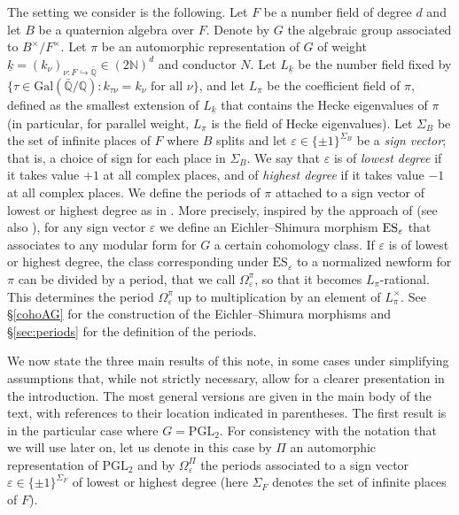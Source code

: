 \documentclass{amsart}
\theoremstyle{definition}
\theoremstyle{remark}
\numberwithin{equation}{section}
\newcommand{\Gal}{{\mathrm {Gal}}}
\newcommand{\PGL}{{\mathrm{PGL}}}
\newcommand{\Q}{{\mathbb Q}}
\newcommand{\N}{{\mathbb N}}
\begin{document}
The setting we consider is the following. Let $F$ be a number field of degree $d$ and let $B$ be a quaternion algebra over $F$. Denote by $G$ the algebraic group associated to $B^\times/F^\times$. Let $\pi$ be an automorphic representation of $G$ of weight $\underline{k}=(k_\nu)_{\nu:F\hookrightarrow \bar \Q}\in (2\N)^d$ and conductor $N$. Let $L_{\underline k}$ be the number field fixed by ${\{\tau\in\Gal(\bar \Q/\Q)\colon k_{\tau\nu}=k_\nu \text{ for all }\nu \}}$, and let $L_\pi$ be the coefficient field of $\pi$, defined as the smallest extension of $L_{\underline k}$ that contains the Hecke eigenvalues of $\pi$  (in particular, for parallel weight, $L_\pi$ is the field of Hecke eigenvalues). Let $\Sigma_B$ be the set of infinite places of $F$ where $B$ splits and let $\varepsilon  \in \{\pm 1\}^{\Sigma_B}$ be a \emph{sign vector}; that is, a choice of sign for each place in $\Sigma_B$.  We say that $\varepsilon$ is of \emph{lowest degree} if it takes value $+1$ at all complex places, and of \emph{highest degree} if it takes value $-1$ at all complex places.  We define the periods of $\pi$ attached to a sign vector of lowest or highest degree as in \cite{preprintsanti2}. More precisely, inspired by the approach of \cite{harder} (see also \cite{ESsanti}), for any sign vector $\varepsilon$ we define an Eichler--Shimura morphism ${\rm ES}_\varepsilon$ that associates to any modular form for $G$ a certain cohomology class.  If $\varepsilon$ is of lowest or highest degree, the class corresponding  under $\mathrm{ES}_\varepsilon$ to a normalized newform for $\pi$ can be divided by a period, that we call $\Omega_\varepsilon^\pi$, so that it becomes $L_\pi$-rational. This determines the period $\Omega_\varepsilon^\pi$ up to multiplication by an element of $L_\pi^\times$. See \S \ref{cohoAG} for the construction of the Eichler--Shimura morphisms and \S \ref{sec:periods} for the definition of the periods.



We now state the three main results of this note, in some cases under simplifying assumptions that, while not strictly necessary, allow for a clearer presentation in the introduction. The most general versions are given in the main body of the text, with references to their location indicated in parentheses. The first result is in the particular case where $G=\PGL_2$. For consistency with the notation that we will use later on, let us denote in this case by $\Pi$ an automorphic representation of $\PGL_2$ and  by $\Omega_\varepsilon^\Pi$ the periods associated to a sign vector $\varepsilon \in \{\pm 1\}^{\Sigma_F}$  of lowest or highest degree (here $\Sigma_F$ denotes the set of infinite places of $F$).
\end{document}
